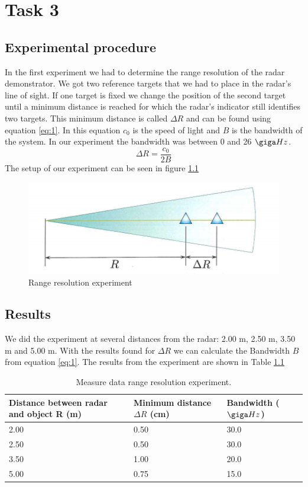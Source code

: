 \documentclass[final]{scrreprt} %
\begin{document}
\chapter{Task 3}
\section{Experimental procedure}
In the first experiment we had to determine the range resolution of the radar demonstrator. 
We got two reference targets that we had to place in the radar's line of sight.
If one target is fixed we change the position of the second target until a minimum distance is reached for which the radar's indicator still identifies two targets.
This minimum distance is called $\Delta R$ and can be found using equation \ref{eq:1}. 
In this equation $c_{0}$ is the speed of light and $B$ is the bandwidth of the system.
In our experiment the bandwidth was between 0 and 26 $\giga Hz$. 
\begin{equation} 
\label{eq:1}
\Delta R= \frac{c_{0}}{2B} 
\end{equation}
The setup of our experiment can be seen in figure \ref{fig:range}
\begin{figure}[h]
	\begin{center}
		\includegraphics[width=\linewidth/2]{resources/meet3.png}
	\end{center}
	\caption{Range resolution experiment}
	\label{fig:range}
\end{figure}


\section{Results}
We did the experiment at several distances from the radar: 2.00 \unit{m}, 2.50 \unit{m}, 3.50 \unit{m} and 5.00 \unit{m}. 
With the results found for $\Delta R$ we can calculate the Bandwidth $B$ from equation \ref{eq:1}.
The results from the experiment are shown in Table \ref{tab:2}
\begin{table}[h]
\begin{center}
\begin{tabular}{ | l | l | l | }
    \hline
    Distance between radar and object R (m) & Minimum distance $\Delta R$ (cm) & Bandwidth ($\giga Hz$)  \\\hline
    2.00 & 0.50 & 30.0 \\\hline
    2.50 & 0.50 & 30.0 \\\hline
    3.50 & 1.00 & 20.0  \\\hline
    5.00 & 0.75 & 15.0  \\\hline
\end{tabular}
\caption{Measure data range resolution experiment.}
\label{tab:2}
\end{center}
\end{table}
\end{document}
